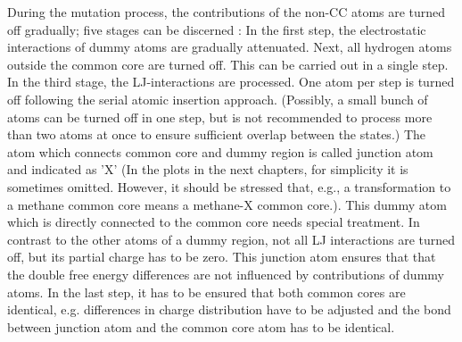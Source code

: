 During the mutation process, the contributions of the non-CC atoms are turned off gradually; five stages can be discerned \cite{Karwounopoulos.2022}:  In the first step, the electrostatic interactions of dummy atoms are gradually attenuated. Next, all hydrogen atoms outside the common core are turned off. This can be carried out in a single step.
In the third stage, the LJ-interactions are processed. One atom per step is turned off following the serial atomic insertion approach. (Possibly, a small bunch of atoms can be turned off in one step, but is not recommended to process more than two atoms at once to ensure sufficient overlap between the states.)
The atom which connects common core and dummy region is  called junction atom and indicated as 'X' \cite{Karwounopoulos.2022} (In the plots in the next chapters, for simplicity it is sometimes omitted. However, it should be stressed that, e.g., a transformation to a methane common core means a methane-X common core.). This dummy atom which is directly connected to the common core needs special treatment. In contrast to the other atoms of a dummy region, not all LJ interactions are turned off, but its partial charge has to be zero.
\cite{Karwounopoulos.2022} This junction atom ensures that that the double free energy differences are not influenced by contributions of dummy atoms.\cite{Fleck.2021}
In the last step, it has to be ensured that both common cores are identical, e.g. differences in charge distribution have to be adjusted and the bond between junction atom and the common core atom has to be identical.

